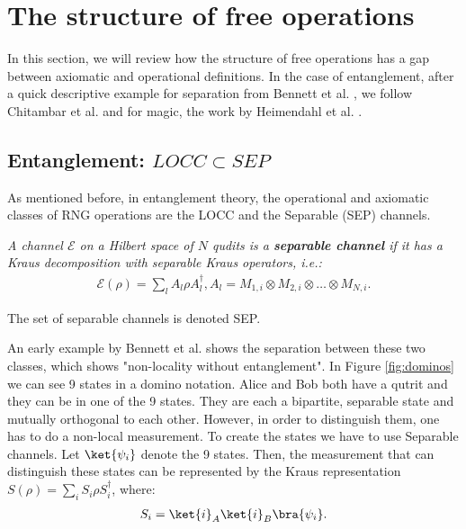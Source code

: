 \section{The structure of free operations}\label{sec:free ops}

In this section, we will review how the structure of free operations has a gap between axiomatic and operational definitions. In the case of entanglement, after a quick descriptive example for separation from Bennett et al. \cite{bennett_quantum_1999}, we follow Chitambar et al. \cite{chitambar_increasing_2012} and for magic, the work by Heimendahl et al.  \cite{heimendahl_axiomatic_2022}. 

\subsection{Entanglement: $LOCC \subset SEP$}

As mentioned before, in entanglement theory, the operational and axiomatic classes of RNG operations are the LOCC and the Separable (SEP) channels. 
\begin{definition}\textit{A channel $\mathcal{E}$ on a Hilbert space of $N$ qudits is a \textbf{separable channel} if it has a Kraus decomposition with separable Kraus operators, i.e.: 
\begin{align}
\mathcal{E}(\rho) = \sum_l A_l \rho A_l^\dagger, A_l = M_{1,i} \otimes M_{2,i} \otimes \ldots \otimes M_{N,i}.
\end{align}}

The set of separable channels is denoted SEP.
\end{definition}
                  
An early example by Bennett et al. \cite{bennett_quantum_1999} shows the separation between these two classes, which shows "non-locality without entanglement". In Figure \ref{fig:dominos} we can see 9 states in a domino notation. Alice and Bob both have a qutrit and they can be in one of the 9 states. They are each a bipartite, separable state and mutually orthogonal to each other. However, in order to distinguish them, one has to do a non-local measurement. To create the states we have to use Separable channels. Let $\ket{\psi_i}$ denote the 9 states. Then, the measurement that can distinguish these states can be represented by the Kraus representation $S(\rho)=\sum_i S_i \rho S_i^\dagger$, where: 
\begin{align}
S_i = \ket{i}_A \ket{i}_B\bra{\psi_i}. 
\end{align}

